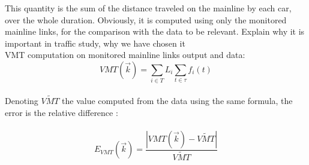 This quantity is the sum of the distance traveled on the mainline by each car, over the whole duration.
Obviously, it is computed using only the monitored mainline links, for the comparison with the data to be relevant.
\color{red}Explain why it is important in traffic study, why we have chosen it\color{black}
\\
VMT computation on monitored mainline links output and data:
\begin{equation*}
	 VMT(\vec{k})=\sum_{i\in{T}}L_{i}\sum_{t\in \tau}f_{i}(t)
\end{equation*}
\\
Denoting $\widetilde{VMT}$ the value computed from the data using the same formula, the error is the relative difference :\\
\\
\begin{equation*}
	E_{VMT}(\vec{k})=\frac{|VMT(\vec{k})-\widetilde{VMT}|}{\widetilde{VMT}}
\end{equation*}

